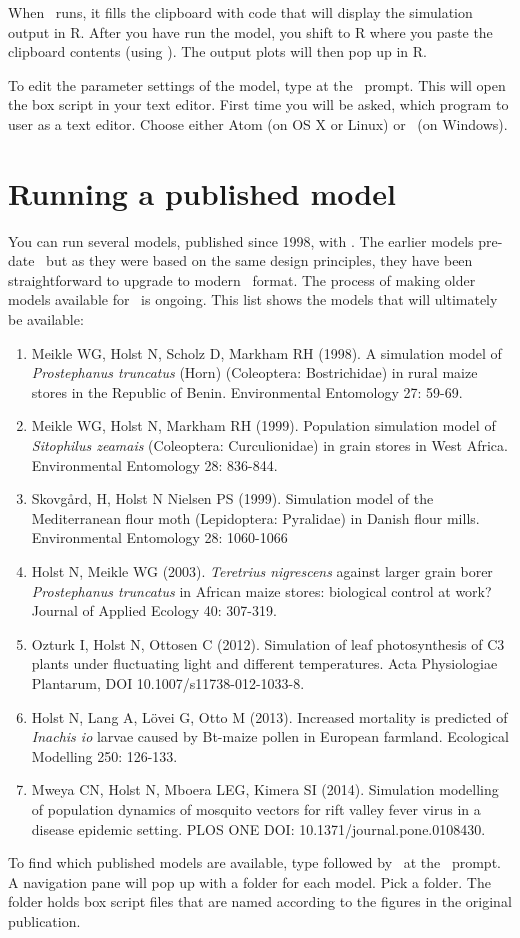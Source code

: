 When \US\ runs, it fills the clipboard with code that will display the simulation output in R. After you have run the model, you shift to R where you paste the clipboard contents (using \pastekey). The output plots will then pop up in R.

To edit the parameter settings of the model, type  at the \US\ prompt. This will open the box script in your text editor. First time you will be asked, which program to user as a text editor. Choose either Atom (on OS X or Linux) or \NPP\ (on Windows). 

\section{Running a published model}
You can run several models, published since 1998, with \US. The earlier models pre-date \US\ but as they were based on the same design principles, they have been straightforward to upgrade to modern \US\ format. The process of making older models available for \US\ is ongoing. This list shows the models that will ultimately be available:

\begin{enumerate}
\item Meikle WG, Holst N, Scholz D, Markham RH (1998). A simulation model of \emph{Prostephanus truncatus} (Horn) (Coleoptera: Bostrichidae) in rural maize stores in the Republic of Benin. Environmental Entomology 27: 59-69.
\item Meikle WG, Holst N, Markham RH (1999). Population simulation model of \emph{Sitophilus zeamais} (Coleoptera: Curculionidae) in grain stores in West Africa. Environmental Entomology 28: 836-844.
\item Skovg\aa{}rd, H, Holst N Nielsen PS (1999). Simulation model of the Mediterranean flour moth (Lepidoptera: Pyralidae) in Danish flour mills. Environmental Entomology 28: 1060-1066
\item Holst N, Meikle WG (2003). \emph{Teretrius nigrescens} against larger grain borer \emph{Prostephanus truncatus} in African maize stores: biological control at work? Journal of Applied Ecology 40: 307-319. 
\item Ozturk I, Holst N, Ottosen C (2012). Simulation of leaf photosynthesis of C3 plants under fluctuating light and different temperatures. Acta Physiologiae Plantarum, DOI 10.1007/s11738-012-1033-8.
\item Holst N, Lang A, L\"{o}vei G, Otto M (2013). Increased mortality is predicted of \emph{Inachis io} larvae caused by Bt-maize pollen in European farmland. Ecological Modelling 250: 126-133.
\item Mweya CN, Holst N,  Mboera LEG, Kimera SI (2014). Simulation modelling of population dynamics of mosquito vectors for rift valley fever virus in a disease epidemic setting. PLOS ONE DOI: 10.1371/journal.pone.0108430.
\end{enumerate}

To find which published models are available, type  followed by \autofillkey\ at the \US\ prompt. A navigation pane will pop up with a folder for each model. Pick a folder. The folder holds box script files that are named according to the figures in the original publication.